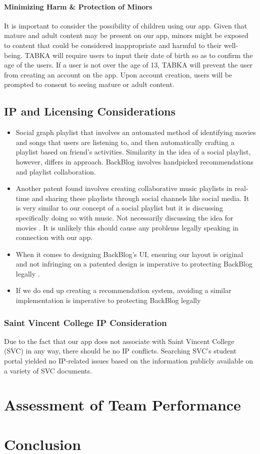 \documentclass[12pt,asmart]{report}
\begin{document}
\subsubsection{Minimizing Harm \& Protection of Minors}
It is important to consider the possibility of children using our app. Given that mature and adult content may be present on our app, minors might be exposed to content that could be considered inappropriate and harmful to their well-being. TABKA will require users to input their date of birth so as to confirm the age of the users. If a user is not over the age of 13, TABKA will prevent the user from creating an account on the app. Upon account creation, users will be prompted to consent to seeing mature or adult content.

\section{IP and Licensing \newline Considerations}
\begin{itemize}
    \item Social graph playlist that involves an automated method of identifying movies and songs that users are listening to, and then automatically crafting a playlist based on friend's activities. Similarity in the idea of a social playlist, however, differs in approach. BackBlog involves handpicked recommendations and playlist collaboration\cite{Murphy2010-gw}.
    \item Another patent found involves creating collaborative music playlists in real-time and sharing these playlists through social channels like social media. It is very similar to our concept of a social playlist but it is discussing specifically doing so with music. Not necessarily discussing the idea for movies \cite{Wheatley2011-pn}. It is unlikely this should cause any problems legally speaking in connection with our app.
    \item When it comes to designing BackBlog's UI, ensuring our layout is original and not infringing on a patented design is imperative to protecting BackBlog legally \cite{Phillips2019-ec}.
    \item If we do end up creating a recommendation system, avoiding a similar implementation is imperative to protecting BackBlog legally \cite{}
\end{itemize}
\subsection{Saint Vincent College IP Consideration}
Due to the fact that our app does not associate with Saint Vincent College (SVC) in any way, there should be no IP conflicts. Searching SVC's student portal yielded no IP-related issues based on the information publicly available on a variety of SVC documents.

\chapter{Assessment of Team Performance}

\chapter{Conclusion}


\nocite{*}


\end{document}
